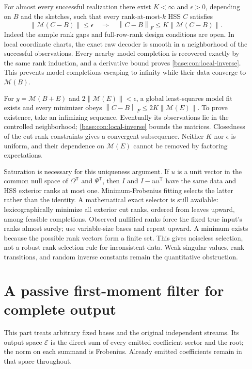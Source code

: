\documentclass[11pt,oneside,openany,a4paper]{book}
\numberwithin{equation}{chapter}
\theoremstyle{definition}
\theoremstyle{remark}
\newcommand{\T}{\mathsf T}\newcommand{\Id}{I}
\newcommand{\F}[1]{\left\lVert#1\right\rVert_F}
\begin{document}
For almost every successful realization there exist $K<\infty$ and $\epsilon>0$, depending on $B$ and the sketches, such that every rank-at-most-$k$ HSS $C$ satisfies
\begin{equation}\label{base:con:local-inverse}
 \|\mathcal M(C-B)\|\le\epsilon
 \quad\Longrightarrow\quad
 \F{C-B}\le K\|\mathcal M(C-B)\|.
\end{equation}
Indeed the sample rank gaps and full-row-rank design conditions are open. In local coordinate charts, the exact raw decoder is smooth in a neighborhood of the successful observations. Every nearby model completion is recovered exactly by the same rank induction, and a derivative bound proves \eqref{base:con:local-inverse}. This prevents model completions escaping to infinity while their data converge to $\mathcal M(B)$.

For $y=\mathcal M(B+E)$ and $2\|\mathcal M(E)\|<\epsilon$, a global least-squares model fit exists and every minimizer obeys
$\F{C-B}\le2K\|\mathcal M(E)\|$. To prove existence, take an infimizing sequence. Eventually its observations lie in the controlled neighborhood; \eqref{base:con:local-inverse} bounds the matrices. Closedness of the cut-rank constraints gives a convergent subsequence. Neither $K$ nor $\epsilon$ is uniform, and their dependence on $\mathcal M(E)$ cannot be removed by factoring expectations.

Saturation is necessary for this uniqueness argument. If $u$ is a unit vector in the common null space of $\Omega^\T$ and $\Psi^\T$, then $I$ and $I-uu^\T$ have the same data and HSS exterior ranks at most one. Minimum-Frobenius fitting selects the latter rather than the identity. A mathematical exact selector is still available: lexicographically minimize all exterior cut ranks, ordered from leaves upward, among feasible completions. Observed nullified ranks force the fixed true input's ranks almost surely; use variable-size bases and repeat upward. A minimum exists because the possible rank vectors form a finite set. This gives noiseless selection, not a robust rank-selection rule for inconsistent data. Weak singular values, rank transitions, and random inverse constants remain the quantitative obstruction.


\section{A passive first-moment filter for complete output}\label{base:con:predictable}
This part treats arbitrary fixed bases and the original independent streams. Its output space $\mathscr E$ is the direct sum of every emitted coefficient sector and the root; the norm on each summand is Frobenius. Already emitted coefficients remain in that space throughout.
\end{document}

